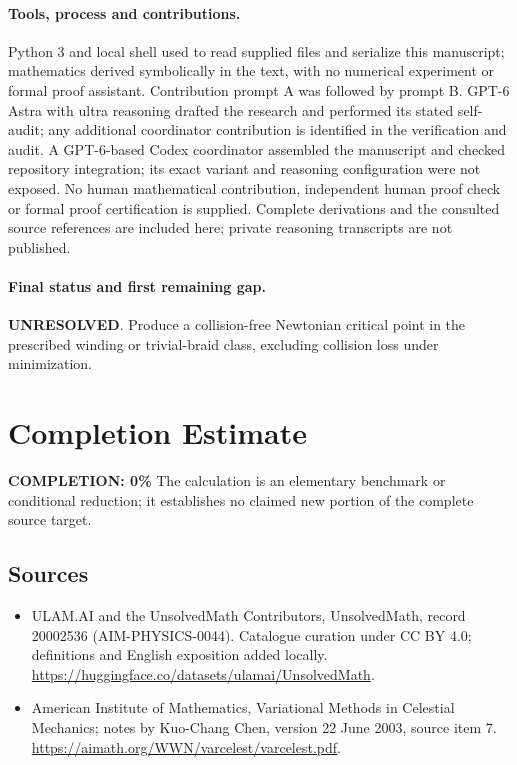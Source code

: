 \documentclass[11pt]{article}
\begin{document}
\paragraph{Tools, process and contributions.}
Python 3 and local shell used to read supplied files and serialize this manuscript; mathematics derived symbolically in the text, with no numerical experiment or formal proof assistant. Contribution prompt A was followed by prompt B. GPT-6 Astra with ultra reasoning drafted the research and performed its stated self-audit; any additional coordinator contribution is identified in the verification and audit. A GPT-6-based Codex coordinator assembled the manuscript and checked repository integration; its exact variant and reasoning configuration were not exposed. No human mathematical contribution, independent human proof check or formal proof certification is supplied. Complete derivations and the consulted source references are included here; private reasoning transcripts are not published.

\paragraph{Final status and first remaining gap.}
\textbf{UNRESOLVED}. Produce a collision-free Newtonian critical point in the prescribed winding or trivial-braid class, excluding collision loss under minimization.

\section{Completion Estimate}
\noindent\textbf{COMPLETION: 0\%}
The calculation is an elementary benchmark or conditional reduction; it establishes no claimed new portion of the complete source target.

\subsection{Sources}
\begin{itemize}
\item[\hypertarget{source:20002536:1}{S1}] ULAM.AI and the UnsolvedMath Contributors, UnsolvedMath, record 20002536 (AIM-PHYSICS-0044). Catalogue curation under CC BY 4.0; definitions and English exposition added locally.
\url{https://huggingface.co/datasets/ulamai/UnsolvedMath}.
\item[\hypertarget{source:20002536:2}{S2}] American Institute of Mathematics, Variational Methods in Celestial Mechanics; notes by Kuo-Chang Chen, version 22 June 2003, source item 7.
\url{https://aimath.org/WWN/varcelest/varcelest.pdf}.
\end{itemize}
\label{end:20002536}
\end{document}
